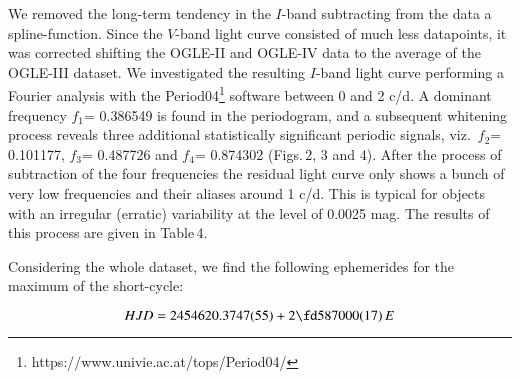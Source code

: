 \documentclass[useAMS,usenatbib]{mn2e}
\begin{document}
We removed the long-term tendency in the $I$-band subtracting from the data a spline-function. 
Since the $V$-band light curve consisted of much less datapoints, it was corrected shifting the OGLE-II and OGLE-IV data to the average of the
OGLE-III dataset. We investigated the resulting $I$-band light curve performing a Fourier analysis with the {\rm Period04}\footnote{https://www.univie.ac.at/tops/Period04/} software \citep{2005CoAst.146...53L} between 0 and 2 c/d. A dominant frequency $f_1$= 0.386549 is found in the periodogram, and a subsequent whitening
process reveals three additional statistically significant periodic signals, viz.\,  $f_2$= 0.101177,
$f_3$= 0.487726 and
$f_4$= 0.874302
(Figs.\,2, 3 and 4).
After the process of subtraction of the four frequencies 
the residual light curve only shows a
bunch of very low frequencies and their
aliases around 1 c/d.
This is typical for objects with an irregular
(erratic) variability at the level of 0.0025 mag.
The results of this process are given in Table\,4. 

Considering the whole dataset, we find the following ephemerides for the maximum of the short-cycle:

 

  \begin{equation}
 HJD = 2454620.3747(55) + 2\fd587000(17)\,E 
  \end{equation}
\end{document}
